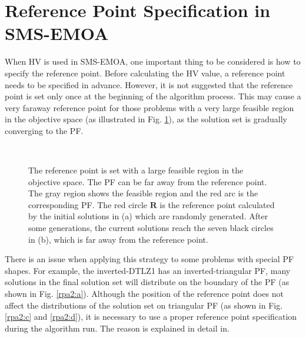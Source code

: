 \documentclass[conference]{IEEEtran}
\begin{document}
\section{Reference Point Specification in SMS-EMOA}
When HV is used in SMS-EMOA, 
one important thing to be considered is how to specify the reference point.
Before calculating the HV value, a reference point needs to be specified in advance.
However, it is not suggested that the reference point is set only once at the beginning of the algorithm process. 
This may cause a very faraway reference point 
for those problems with a very large feasible region in the objective space (as illustrated in Fig. \ref{rpa1}),
as the solution set is gradually converging to the PF. 

\begin{figure}[!t]
  \centering
  \quad
  \\
  \caption{The reference point is set with a large feasible region in the objective space.
  The PF can be far away from the reference point.
  The gray region shows the feasible region and the red arc is the corresponding PF.
  The red circle $\boldsymbol R$ is the reference point calculated by the initial solutions in (a)
  which are randomly generated. 
  After some generations, the current solutions reach the seven black circles in (b), 
  which is far away from the reference point.}
  \label{rpa1}
\end{figure}

There is an issue when applying this strategy to some problems with special PF shapes. 
For example, the inverted-DTLZ1\cite{invertedDTLZ1} has an inverted-triangular PF, 
many solutions in the final solution set will distribute on the boundary of the PF
(as shown in Fig. \ref{rpa2:a})\cite{hisao:RPexplanation, hisao:RPspecify, hisao:dynamic}. 
Although the position of the reference point does not affect the distributions of the solution set 
on triangular PF 
(as shown in Fig. \ref{rpa2:c} and \ref{rpa2:d}), 
it is necessary to use a proper reference point specification during the algorithm run.
The reason is explained in detail in\cite{hisao:RPexplanation}.
\end{document}
